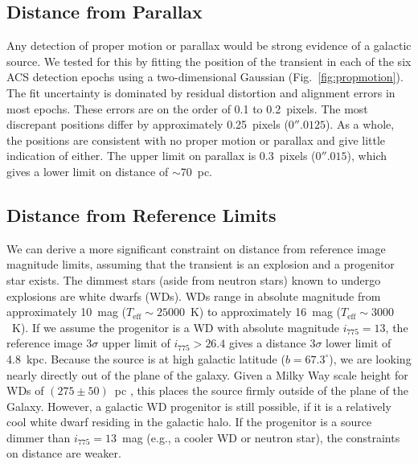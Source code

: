 \subsection{Distance from Parallax}
Any detection of proper motion or parallax would be strong evidence of
a galactic source. We tested for this by fitting the position of the
transient in each of the six ACS detection epochs using a
two-dimensional Gaussian (Fig.~\ref{fig:propmotion}).  The fit
uncertainty is dominated by residual distortion and alignment errors
in most epochs.  These errors are on the order of 0.1 to 0.2~pixels.
The most discrepant positions differ by approximately 0.25~pixels
($0''.0125$).  As a whole, the positions are consistent with no proper
motion or parallax and give little indication of either.  The upper
limit on parallax is 0.3~pixels ($0''.015$), which gives a lower limit
on distance of $\sim$70~pc.

\subsection{Distance from Reference Limits}
We can derive a more significant constraint on distance from reference
image magnitude limits, assuming that the transient is an explosion
and a progenitor star exists. The dimmest stars (aside from neutron
stars) known to undergo explosions are white dwarfs (WDs).  WDs range
in absolute magnitude from approximately 10~mag
($T_\mathrm{eff}\sim25000$~K) to approximately 16~mag
($T_\mathrm{eff}\sim3000$~K).  If we assume the progenitor is a WD
with absolute magnitude $i_{775} = 13$, the reference image $3\sigma$
upper limit of $i_{775} > 26.4$ gives a distance $3\sigma$ lower limit
of 4.8~kpc. Because the source is at high galactic latitude ($b =
67.3^\circ$), we are looking nearly directly out of the plane of the
galaxy. Given a Milky Way scale height for WDs of $(275 \pm 50)$~pc
\citep{boyle89a}, this places the source firmly outside of the plane
of the Galaxy. However, a galactic WD progenitor is still possible, if
it is a relatively cool white dwarf residing in the galactic halo. If
the progenitor is a source dimmer than $i_{775} = 13$~mag (e.g., a
cooler WD or neutron star), the constraints on distance are weaker.

